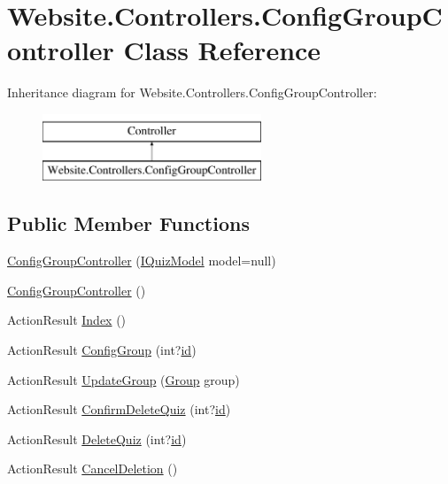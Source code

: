 \hypertarget{class_website_1_1_controllers_1_1_config_group_controller}{}\section{Website.\+Controllers.\+Config\+Group\+Controller Class Reference}
\label{class_website_1_1_controllers_1_1_config_group_controller}
Inheritance diagram for Website.\+Controllers.\+Config\+Group\+Controller\+:\begin{figure}[H]
\begin{center}
\leavevmode
\includegraphics[height=2.000000cm]{class_website_1_1_controllers_1_1_config_group_controller}
\end{center}
\end{figure}
\subsection*{Public Member Functions}
\begin{DoxyCompactItemize}
\item 
\hyperlink{class_website_1_1_controllers_1_1_config_group_controller_ab7276de95cd26d22595cd32983d783df}{Config\+Group\+Controller} (\hyperlink{interface_website_1_1_controllers_1_1_i_quiz_model}{I\+Quiz\+Model} model=null)
\item 
\hyperlink{class_website_1_1_controllers_1_1_config_group_controller_a939f20cd6f34238262b27a224ccdd722}{Config\+Group\+Controller} ()
\item 
Action\+Result \hyperlink{class_website_1_1_controllers_1_1_config_group_controller_a56bd8bda22f10b049c80aaf444edd2f9}{Index} ()
\item 
Action\+Result \hyperlink{class_website_1_1_controllers_1_1_config_group_controller_a36456b39d2a69cd08c72121cc77abdc2}{Config\+Group} (int?\hyperlink{_facebook_8js_a9b3d01084d4285e8b0289ee3f959999b}{id})
\item 
Action\+Result \hyperlink{class_website_1_1_controllers_1_1_config_group_controller_ad6c7a84dc4ea252e8355b1971d99c1a3}{Update\+Group} (\hyperlink{class_website_1_1_models_1_1_group}{Group} group)
\item 
Action\+Result \hyperlink{class_website_1_1_controllers_1_1_config_group_controller_a8834760abe65a2f55e157280ae4fd9e3}{Confirm\+Delete\+Quiz} (int?\hyperlink{_facebook_8js_a9b3d01084d4285e8b0289ee3f959999b}{id})
\item 
Action\+Result \hyperlink{class_website_1_1_controllers_1_1_config_group_controller_a4328095cbe59fbf8326be4f0a415972f}{Delete\+Quiz} (int?\hyperlink{_facebook_8js_a9b3d01084d4285e8b0289ee3f959999b}{id})
\item 
Action\+Result \hyperlink{class_website_1_1_controllers_1_1_config_group_controller_a31009a483fecb5549b0f4c92f4e73ef7}{Cancel\+Deletion} ()
\end{DoxyCompactItemize}

